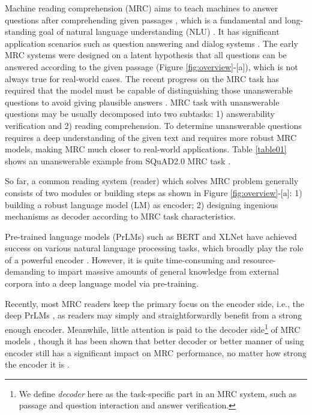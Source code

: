 \documentclass[letterpaper]{article} \usepackage{aaai21}  \usepackage{times}  \usepackage{helvet} \usepackage{courier}  \usepackage[hyphens]{url}  \usepackage{graphicx}
\begin{document}
Machine reading comprehension (MRC) aims to teach machines to answer questions after comprehending given passages \cite{hermann2015teaching,Joshi2017TriviaQA,Rajpurkar2018Know}, which is a fundamental and long-standing goal of natural language understanding (NLU) \cite{zhang2020mrc}. It has significant application scenarios such as question answering and dialog systems \cite{zhang2018modeling,choi2018quac,reddy2019coqa,zhang2018mrc,xu2020topic,zhu2018lingke}.
The early MRC systems \cite{kadlec2016text,Chen2016A,Dhingra2017Gated,Wang2017Gated,Seo2016Bidirectional} were designed on a latent hypothesis that all questions can be answered according to the given passage (Figure \ref{fig:overview}-[a]), which is not always true for real-world cases. The recent progress on the MRC task has required that the model must be capable of distinguishing those unanswerable questions to avoid giving plausible answers \cite{Rajpurkar2018Know}. MRC task with unanswerable questions may be usually decomposed into two subtasks: 1) answerability verification and 2) reading comprehension.
To determine unanswerable questions requires a deep understanding of the given text and requires more robust MRC models, making MRC much closer to real-world applications. Table \ref{table01} shows an unanswerable example from SQuAD2.0 MRC task \cite{Rajpurkar2018Know}. 








So far, a common reading system (reader) which solves MRC problem generally consists of two modules or building steps as shown in Figure \ref{fig:overview}-[a]:
1) building a robust language model (LM) as encoder; 2) designing ingenious mechanisms as decoder according to MRC task characteristics.

Pre-trained language models (PrLMs) such as BERT \cite{devlin2018bert} and XLNet \cite{yang2019xlnet} have achieved success on various natural language processing tasks, which broadly play the role of a powerful encoder \cite{zhang2019explicit,li2020explicit,zhou2019limit}. However, it is quite time-consuming and resource-demanding to impart massive amounts of general knowledge from external corpora into a deep language model via pre-training. 



Recently, most MRC readers keep the primary focus on the encoder side, i.e., the deep PrLMs \cite{devlin2018bert,yang2019xlnet,Lan2020ALBERT}, as readers may simply and straightforwardly benefit from a strong enough encoder. Meanwhile, little attention is paid to the decoder side\footnote{We define \textit{decoder} here as the task-specific part in an MRC system, such as passage and question interaction and answer verification.} of MRC models \cite{hu2019read,back2020neurquri,reddy2020answer}, though it has been shown that better decoder or better manner of using encoder still has a significant impact on MRC performance, no matter how strong the encoder it is \cite{dcmn20,liu2021filling,li2019dependency,li2018unified,zhu2020dual}. 
\end{document}
